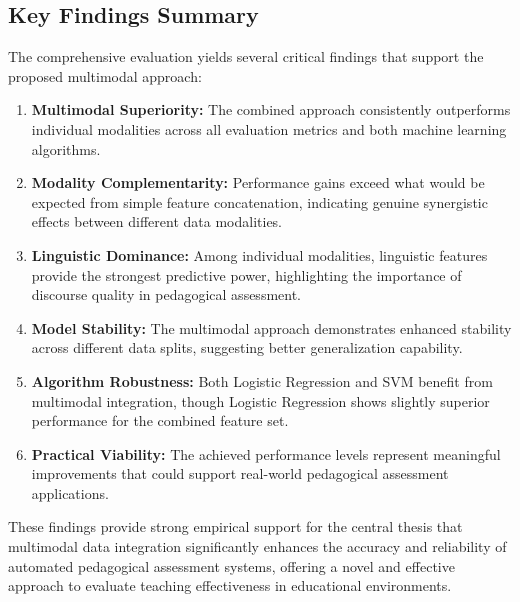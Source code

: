 \subsection{Key Findings Summary}

The comprehensive evaluation yields several critical findings that support the proposed multimodal approach:

\begin{enumerate}
    \item \textbf{Multimodal Superiority:} The combined approach consistently outperforms individual modalities across all evaluation metrics and both machine learning algorithms.
    
    \item \textbf{Modality Complementarity:} Performance gains exceed what would be expected from simple feature concatenation, indicating genuine synergistic effects between different data modalities.
    
    \item \textbf{Linguistic Dominance:} Among individual modalities, linguistic features provide the strongest predictive power, highlighting the importance of discourse quality in pedagogical assessment.
    
    \item \textbf{Model Stability:} The multimodal approach demonstrates enhanced stability across different data splits, suggesting better generalization capability.
    
    \item \textbf{Algorithm Robustness:} Both Logistic Regression and SVM benefit from multimodal integration, though Logistic Regression shows slightly superior performance for the combined feature set.
    
    \item \textbf{Practical Viability:} The achieved performance levels represent meaningful improvements that could support real-world pedagogical assessment applications.
\end{enumerate}

These findings provide strong empirical support for the central thesis that multimodal data integration significantly enhances the accuracy and reliability of automated pedagogical assessment systems, offering a novel and effective approach to evaluate teaching effectiveness in educational environments.
